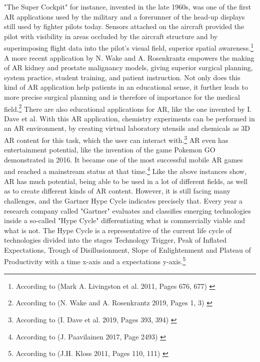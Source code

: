 \documentclass[12pt,a4paper,oneside,american,parskip=half]{article}
\begin{document}
\begin{justify}
\begin{normalsize}
\newline
"The Super Cockpit" for instance, invented in the late 1960s, was one of the first AR applications used by the military and a forerunner of the head-up displays still used by fighter pilots today. Sensors attached on the aircraft provided the pilot with visibility in areas occluded by the aircraft structure and by superimposing flight data into the pilot's visual field, superior spatial awareness.\footnote{According to (Mark A. Livingston et al. 2011, Pages 676, 677) \cite{livingston}}
\newline
A more recent application by N. Wake and A. Rosenkrantz empowers the making of AR kidney and prostate malignancy models, giving superior surgical planning, system practice, student training, and patient instruction. Not only does this kind of AR application help patients in an educational sense, it further leads to more precise surgical planning and is therefore of importance for the medical field.\footnote{According to (N. Wake and A. Rosenkrantz 2019, Pages 1, 3) \cite{wake2019}}
\newline
There are also educational applications for AR, like the one invented by I. Dave et al. 
With this AR application, chemistry experiments can be performed in an AR environment, by creating virtual laboratory utensils and chemicals as 3D AR content for this task, which the user can interact with.\footnote{According to (I. Dave et al. 2019, Pages 393, 394) \cite{chemistry}}
\newline
AR even has entertainment potential, like the invention of the game Pokemon GO demonstrated in 2016. It became one of the most successful mobile AR games and reached a mainstream status at that time.\footnote{According to (J. Paavilainen 2017, Page 2493) \cite{pokemon}}
\newline
Like the above instances show, AR has much potential, being able to be used in a lot of different fields, as well as to create different kinds of AR content.
However, it is still facing many challenges, and the Gartner Hype Cycle indicates precisely that.
Every year a research company called "Gartner" evaluates and classifies emerging technologies inside a so-called "Hype Cycle" differentiating what is commercially viable and what is not. The Hype Cycle is a representative of the current life cycle of technologies divided into the stages Technology Trigger, Peak of Inflated Expectations, Trough of Disillusionment, Slope of Enlightenment and Plateau of Productivity with a time x-axis and a expectations y-axis.\footnote{According to (J.H. Kloss 2011, Pages 110, 111) \cite{cycle01}}

\end{normalsize}
\end{justify}
\end{document}
